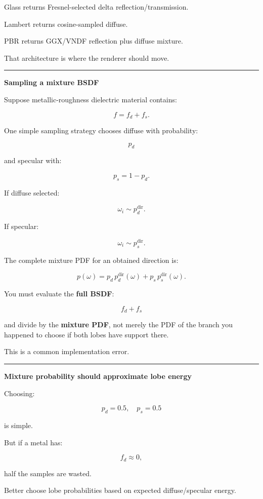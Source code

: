 Glass returns Fresnel-selected delta reflection/transmission.

Lambert returns cosine-sampled diffuse.

PBR returns GGX/VNDF reflection plus diffuse mixture.

That architecture is where the renderer should move.

\begin{center}\rule{0.5\linewidth}{0.5pt}\end{center}

\textbf{Sampling a mixture BSDF}

Suppose metallic-roughness dielectric material contains:

\[
f=
f_d+f_s.
\]

One simple sampling strategy chooses diffuse with probability:

\[
p_d
\]

and specular with:

\[
p_s=1-p_d.
\]

If diffuse selected:

\[
\omega_i\sim p_d^{\text{dir}}.
\]

If specular:

\[
\omega_i\sim p_s^{\text{dir}}.
\]

The complete mixture PDF for an obtained direction is:

\[
\boxed{
p(\omega)
=
p_d\,p_d^{\text{dir}}(\omega)
+
p_s\,p_s^{\text{dir}}(\omega).
}
\]

You must evaluate the \textbf{full BSDF}:

\[
f_d+f_s
\]

and divide by the \textbf{mixture PDF}, not merely the PDF of the branch you happened to choose if both lobes have support there.

This is a common implementation error.

\begin{center}\rule{0.5\linewidth}{0.5pt}\end{center}

\textbf{Mixture probability should approximate lobe energy}

Choosing:

\[
p_d=0.5,
\quad
p_s=0.5
\]

is simple.

But if a metal has:

\[
f_d\approx0,
\]

half the samples are wasted.

Better choose lobe probabilities based on expected diffuse/specular energy.

